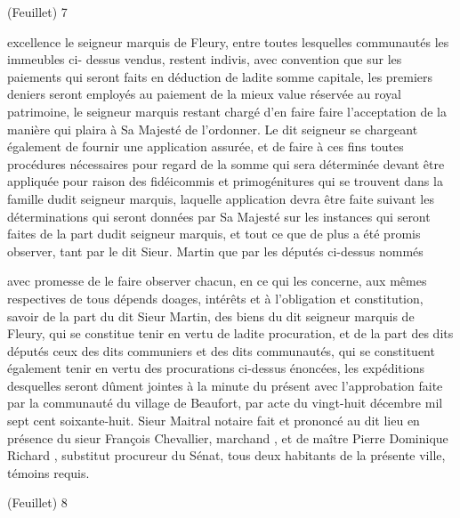 \documentclass[a4paper,twoside,openany]{article}
\begin{document}
\begin{flushright}
(Feuillet) 7
\end{flushright}	
excellence le seigneur marquis de Fleury, entre
toutes lesquelles communautés les immeubles ci-
dessus vendus, restent indivis, avec convention que
sur les paiements qui seront faits en déduction de
ladite somme capitale, les premiers deniers seront
employés au paiement de la mieux value réservée
au royal patrimoine, le seigneur marquis restant
chargé d’en faire faire l’acceptation de la
manière qui plaira à Sa Majesté de l’ordonner.
Le dit seigneur se chargeant également de fournir
une application assurée, et de faire à ces fins toutes
procédures nécessaires pour regard de la somme
qui sera déterminée devant être appliquée pour
raison des fidéicommis et primogénitures qui se
trouvent dans la famille dudit seigneur marquis,
laquelle application devra être faite suivant
les déterminations qui seront données par
Sa Majesté sur les instances qui seront faites de
la part dudit seigneur marquis, et tout ce que
de plus a été promis observer, tant par le dit
Sieur. Martin
que par les députés ci-dessus nommés


avec promesse de le faire observer chacun, en
ce qui les concerne, aux mêmes respectives de tous
dépends \gls{doages}, intérêts et à l’obligation et
constitution, savoir de la part du dit Sieur Martin,
des biens du dit seigneur marquis de Fleury,
qui se constitue tenir en vertu de ladite
procuration, et de la part des dits députés
ceux des dits communiers et des dits communautés,
qui se constituent également tenir en vertu
des procurations ci-dessus énoncées, les expéditions
desquelles seront dûment jointes à la minute
du présent avec l’approbation faite par la
communauté du village de Beaufort, par
acte du vingt-huit décembre mil sept cent
soixante-huit. Sieur Maitral notaire fait et prononcé
au dit lieu en présence du sieur François Chevallier,
marchand , et de maître Pierre Dominique Richard ,
substitut procureur du Sénat, tous deux habitants
de la présente ville, témoins requis.


\begin{flushright}
(Feuillet) 8
\end{flushright}
\end{document}
